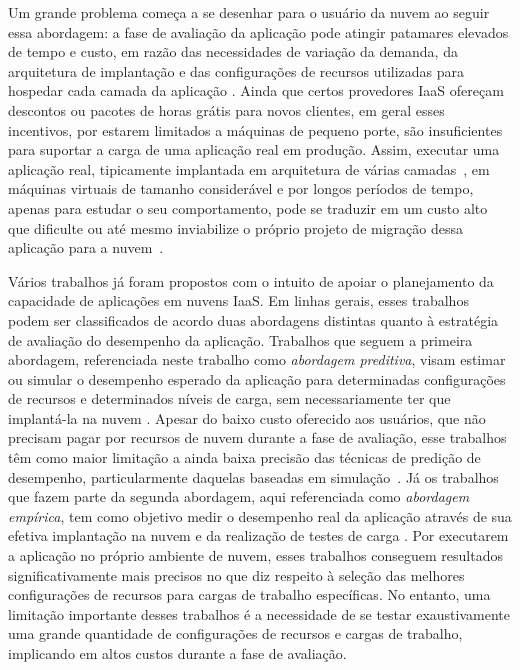\documentclass[10pt,conference,compsocconf]{IEEEtran}
\begin{document}
Um grande problema começa a se desenhar para o usuário da nuvem ao seguir essa abordagem: a fase de avaliação da 
aplicação pode atingir patamares elevados de tempo e custo, em razão das necessidades de variação da demanda, da 
arquitetura de implantação e das configurações de recursos utilizadas para hospedar 
cada camada da aplicação \cite{silva2013cloudbench}. Ainda que certos provedores IaaS ofereçam descontos ou 
pacotes de horas grátis para novos clientes, em geral esses incentivos, por estarem limitados a máquinas de pequeno porte, são 
insuficientes para suportar a carga de uma aplicação real em produção. Assim, executar uma aplicação real, tipicamente 
implantada em arquitetura de várias camadas~\cite{jayasinghe2011variations}, em máquinas virtuais de tamanho 
considerável e por longos períodos de tempo, apenas para estudar o seu comportamento, pode se traduzir em um custo 
alto que dificulte ou até mesmo inviabilize o próprio projeto de migração dessa aplicação para a nuvem~\cite{beserra2012cloudstep}. 

Vários trabalhos já foram propostos com o intuito de apoiar o planejamento da capacidade de aplicações em nuvens IaaS. Em 
linhas gerais, esses trabalhos podem ser classificados de acordo duas abordagens distintas quanto à estratégia de 
avaliação do desempenho da aplicação. Trabalhos que seguem a primeira abordagem, referenciada neste 
trabalho como \emph{abordagem preditiva}, visam estimar ou simular o desempenho esperado da aplicação para determinadas 
configurações de recursos e determinados níveis de carga, sem necessariamente
ter que implantá-la na nuvem  \cite{cloudharmony, malkowski2010cloudxplor, li2011, li2011cloudprophet, fittkau2012cdosim, jung2013cloudadvisor}. Apesar do baixo custo oferecido aos usuários, que não precisam pagar por recursos de nuvem durante a fase de avaliação, esse trabalhos têm como maior limitação a ainda baixa precisão das técnicas de predição de desempenho, particularmente daquelas baseadas em simulação~\cite{fittkau2012cdosim}. Já os trabalhos que fazem parte da segunda abordagem, aqui referenciada como \emph{abordagem empírica}, tem como objetivo medir o desempenho real da aplicação através de sua efetiva implantação na nuvem e da realização de testes de carga \cite{jayasinghe2012, silva2013cloudbench, cunha2013b, scheuner2014cloud}. Por executarem a aplicação no próprio ambiente de nuvem, esses trabalhos conseguem resultados significativamente mais precisos no que diz respeito à seleção das melhores configurações de recursos para cargas de trabalho específicas. No entanto, uma limitação importante desses trabalhos é a necessidade de se testar exaustivamente uma grande quantidade de configurações de recursos e cargas de trabalho, implicando em altos custos durante a fase de avaliação.
\end{document}
